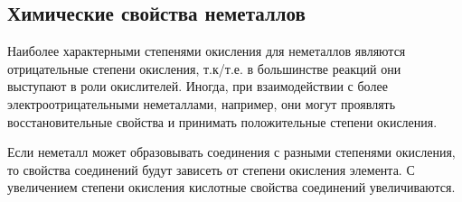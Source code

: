 \subsection{Химические свойства неметаллов}

Наиболее характерными степенями окисления для неметаллов являются отрицательные степени окисления, т.к/т.е. в большинстве реакций они выступают в роли окислителей. Иногда, при взаимодействии с более электроотрицательными неметаллами, например, они могут проявлять восстановительные свойства и принимать положительные степени окисления.

Если неметалл может образовывать соединения с разными степенями окисления, то свойства соединений будут зависеть от степени окисления элемента. С увеличением степени окисления кислотные свойства соединений увеличиваются.

